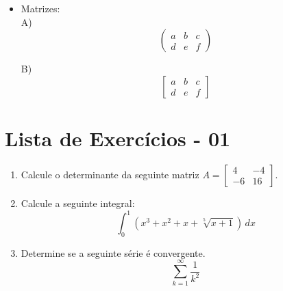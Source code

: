 \documentclass[12pt]{article}
\begin{document}
\begin{itemize}
    \item Matrizes: \\
          A)
          \[
              \begin{pmatrix}
                  a & b & c \\
                  d & e & f
              \end{pmatrix}
          \]

          \medskip

          B)
          \[
              \begin{bmatrix}
                  a & b & c \\
                  d & e & f
              \end{bmatrix}
          \]
\end{itemize}

\section*{Lista de Exercícios - 01}

\begin{enumerate}

    \item Calcule o determinante da seguinte matriz $A =
              \begin{bmatrix}
                  4  & -4 \\
                  -6 & 16
              \end{bmatrix}$.

    \item Calcule a seguinte integral:
          \[
              \int_0^1 \left( x^3 + x^2 + x + \sqrt[5]{x+1} \right) \, dx
          \]

    \item Determine se a seguinte série é convergente.
          \[
              \sum_{k=1}^{\infty} \frac{1}{k^2}
          \]

\end{enumerate}
\end{document}
